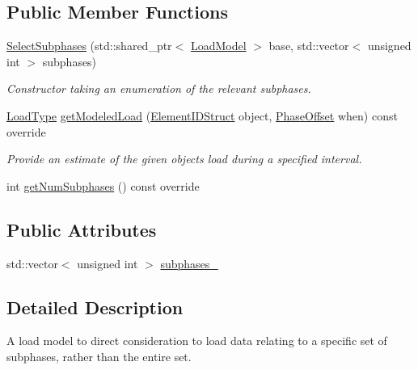 \subsection*{Public Member Functions}
\begin{DoxyCompactItemize}
\item 
\hyperlink{classvt_1_1vrt_1_1collection_1_1balance_1_1_select_subphases_a6eeee8aa0dce1a0483549835006a0bed}{Select\+Subphases} (std\+::shared\+\_\+ptr$<$ \hyperlink{structvt_1_1vrt_1_1collection_1_1balance_1_1_load_model}{Load\+Model} $>$ base, std\+::vector$<$ unsigned int $>$ subphases)
\begin{DoxyCompactList}\small\item\em Constructor taking an enumeration of the relevant subphases. \end{DoxyCompactList}\item 
\hyperlink{namespacevt_a8fb51741340b87d7aaee0bef60e9896b}{Load\+Type} \hyperlink{classvt_1_1vrt_1_1collection_1_1balance_1_1_select_subphases_aec778ff13dabe0ebda6489d18d8be4fd}{get\+Modeled\+Load} (\hyperlink{namespacevt_1_1vrt_1_1collection_1_1balance_a9f5b53fafb270212279a4757d2c4cd28}{Element\+I\+D\+Struct} object, \hyperlink{structvt_1_1vrt_1_1collection_1_1balance_1_1_phase_offset}{Phase\+Offset} when) const override
\begin{DoxyCompactList}\small\item\em Provide an estimate of the given object\textquotesingle{}s load during a specified interval. \end{DoxyCompactList}\item 
int \hyperlink{classvt_1_1vrt_1_1collection_1_1balance_1_1_select_subphases_aa92c8fa929624c30a25442391bc3e80d}{get\+Num\+Subphases} () const override
\end{DoxyCompactItemize}
\subsection*{Public Attributes}
\begin{DoxyCompactItemize}
\item 
std\+::vector$<$ unsigned int $>$ \hyperlink{classvt_1_1vrt_1_1collection_1_1balance_1_1_select_subphases_ad9ad62b67851546a4377ee6a4e17181e}{subphases\+\_\+}
\end{DoxyCompactItemize}


\subsection{Detailed Description}
A load model to direct consideration to load data relating to a specific set of subphases, rather than the entire set. 

